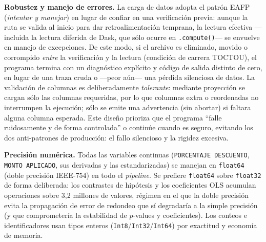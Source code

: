 \documentclass[12pt,letterpaper]{article}
\begin{document}
\textbf{Robustez y manejo de errores.} La carga de datos adopta el patrón EAFP (\textit{intentar y manejar}) en lugar de confiar en una verificación previa: aunque la ruta se valida al inicio para dar retroalimentación temprana, la lectura efectiva —incluida la lectura diferida de Dask, que sólo ocurre en \texttt{.compute()}— se envuelve en manejo de excepciones. De este modo, si el archivo es eliminado, movido o corrompido \textit{entre} la verificación y la lectura (condición de carrera TOCTOU), el programa termina con un diagnóstico explícito y código de salida distinto de cero, en lugar de una traza cruda o —peor aún— una pérdida silenciosa de datos. La validación de columnas es deliberadamente \textit{tolerante}: mediante proyección se cargan sólo las columnas requeridas, por lo que columnas extra o reordenadas no interrumpen la ejecución; sólo se emite una advertencia (sin abortar) si faltara alguna columna esperada. Este diseño prioriza que el programa ``falle ruidosamente y de forma controlada'' o continúe cuando es seguro, evitando los dos anti-patrones de producción: el fallo silencioso y la rigidez excesiva.

\textbf{Precisión numérica.} Todas las variables continuas (\texttt{PORCENTAJE DESCUENTO}, \texttt{MONTO APLICADO}, sus derivadas y las estandarizadas) se manejan en \texttt{float64} (doble precisión IEEE-754) en todo el \textit{pipeline}. Se prefiere \texttt{float64} sobre \texttt{float32} de forma deliberada: los contrastes de hipótesis y los coeficientes OLS acumulan operaciones sobre 3,2 millones de valores, régimen en el que la doble precisión evita la propagación de error de redondeo que sí degradaría a la simple precisión (y que comprometería la estabilidad de $p$-values y coeficientes). Los conteos e identificadores usan tipos enteros (\texttt{Int8}/\texttt{Int32}/\texttt{Int64}) por exactitud y economía de memoria.
\end{document}
